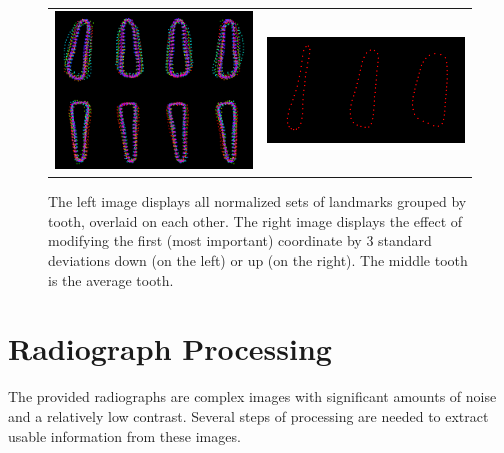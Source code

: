 \documentclass[a4paper,10pt]{article}
\begin{document}
\begin{figure}[h]

\begin{tabular}{cc}
\includegraphics[width=80mm]{landmarks.png} & \includegraphics[width=80mm]{modelvar-0-0.png}\\
 
\end{tabular}
 \caption{The left image displays all normalized sets of landmarks grouped by tooth, overlaid on each other. The right image displays the effect of modifying the first (most important) coordinate by 3 standard deviations down (on the left) or up (on the right). The middle tooth is the average tooth.}
\end{figure}

\newpage
\section{Radiograph Processing}
The provided radiographs are complex images with significant amounts of noise and a relatively low contrast. Several steps of processing are needed to extract usable information from these images. \\
\end{document}

